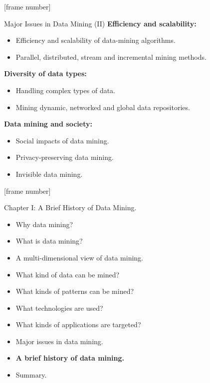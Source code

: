 \documentclass[aspectratio=169,t]{beamer}
\begin{document}
  {
    [frame number]
    \begin{frame}{Major Issues in Data Mining (II)}
    \textbf{Efficiency and scalability:}\\
    \begin{itemize}
        \item Efficiency and scalability of data-mining algorithms.
        \item Parallel, distributed, stream and incremental mining methods.
    \end{itemize}
    \textbf{Diversity of data types:}\\
    \begin{itemize}
        \item Handling complex types of data.
        \item Mining dynamic, networked and global data repositories.
    \end{itemize}
    \textbf{Data mining and society:}\\
    \begin{itemize}
        \item Social impacts of data mining.
        \item Privacy-preserving data mining.
        \item Invisible data mining.
    \end{itemize}
    \end{frame}
  }


 {
    [frame number]
    \begin{frame}{Chapter I: A Brief History of Data Mining.}
        \begin{itemize}
            \item Why data mining?
            \item What is data mining?
            \item A multi-dimensional view of data mining.
            \item What kind of data can be mined?
            \item What kinds of patterns can be mined?
            \item What technologies are used?
            \item What kinds of applications are targeted?
            \item Major issues in data mining.
            \item \textbf{A brief history of data mining.}
            \item Summary.
        \end{itemize}
    \end{frame}
  }
\end{document}
